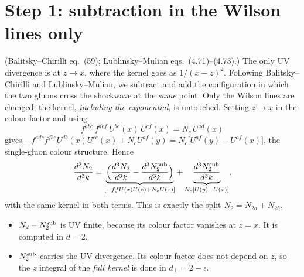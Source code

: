 \documentclass[10pt]{article}
\numberwithin{equation}{section}
\begin{document}
\section{Step 1: subtraction in the Wilson lines only}
(Balitsky--Chirilli eq.~(59); Lublinsky--Mulian eqs.~(4.71)--(4.73).)
The only UV divergence is at $z\to x$, where the kernel goes as $1/(x-z)^{2}$. Following Balitsky--Chirilli and Lublinsky--Mulian, we subtract and add the configuration in which the two gluons cross the shockwave at the \emph{same} point. Only the Wilson lines are changed; the kernel, \emph{including the exponential}, is untouched. Setting $z\to x$ in the colour factor and using
\begin{equation}
f^{abc}\,f^{def}\,U^{be}(x)\,U^{cf}(x)=N_{c}\,U^{ad}(x)
\end{equation}
gives $-f^{adc}f^{fbe}U^{db}(x)U^{ce}(x)+N_{c}U^{af}(y)=N_{c}\big[U^{af}(y)-U^{af}(x)\big]$, the single-gluon colour structure. Hence
\begin{equation}
\frac{d^{3}N_{2}}{d^{3}k}=\underbrace{\Big(\frac{d^{3}N_{2}}{d^{3}k}-\frac{d^{3}N^{\rm sub}_{2}}{d^{3}k}\Big)}_{[-ffU(x)U(z)+N_{c}U(x)]}+\underbrace{\frac{d^{3}N^{\rm sub}_{2}}{d^{3}k}}_{N_{c}[U(y)-U(x)]},
\end{equation}
with the same kernel in both terms. This is exactly the split $N_{2}=N_{2a}+N_{2b}$.
\begin{itemize}
\item $N_{2}-N_{2}^{\rm sub}$ is UV finite, because its colour factor vanishes at $z=x$. It is computed in $d=2$.
\item $N_{2}^{\rm sub}$ carries the UV divergence. Its colour factor does not depend on $z$, so the $z$ integral of the \emph{full kernel} is done in $d_{\perp}=2-\epsilon$.
\end{itemize}
\end{document}
